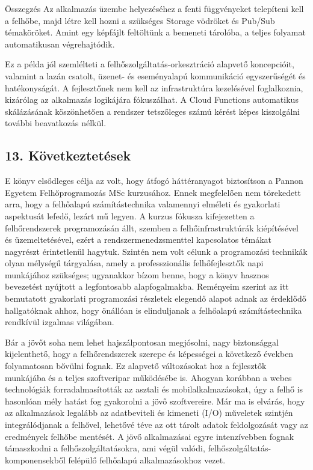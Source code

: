 \documentclass[
]{article}
\begin{document}
Összegzés Az alkalmazás üzembe helyezéséhez a fenti függvényeket
telepíteni kell a felhőbe, majd létre kell hozni a szükséges Storage
vödröket és Pub/Sub témaköröket. Amint egy képfájlt feltöltünk a
bemeneti tárolóba, a teljes folyamat automatikusan végrehajtódik.

Ez a példa jól szemlélteti a felhőszolgáltatás-orkesztráció alapvető
koncepcióit, valamint a lazán csatolt, üzenet- és eseményalapú
kommunikáció egyszerűségét és hatékonyságát. A fejlesztőnek nem kell az
infrastruktúra kezelésével foglalkoznia, kizárólag az alkalmazás
logikájára fókuszálhat. A Cloud Functions automatikus skálázásának
köszönhetően a rendszer tetszőleges számú kérést képes kiszolgálni
további beavatkozás nélkül.

\hypertarget{kuxf6vetkeztetuxe9sek}{%
\subsection{13. Következtetések}\label{kuxf6vetkeztetuxe9sek}}

E könyv elsődleges célja az volt, hogy átfogó háttéranyagot biztosítson
a Pannon Egyetem Felhőprogramozás MSc kurzusához. Ennek megfelelően nem
törekedett arra, hogy a felhőalapú számítástechnika valamennyi elméleti
és gyakorlati aspektusát lefedő, lezárt mű legyen. A kurzus fókusza
kifejezetten a felhőrendszerek programozásán állt, szemben a
felhőinfrastruktúrák kiépítésével és üzemeltetésével, ezért a
rendszermenedzsmenttel kapcsolatos témákat nagyrészt érintetlenül
hagytuk. Szintén nem volt célunk a programozási technikák olyan mélységű
tárgyalása, amely a professzionális felhőfejlesztők napi munkájához
szükséges; ugyanakkor bízom benne, hogy a könyv hasznos bevezetést
nyújtott a legfontosabb alapfogalmakba. Reményeim szerint az itt
bemutatott gyakorlati programozási részletek elegendő alapot adnak az
érdeklődő hallgatóknak ahhoz, hogy önállóan is elinduljanak a felhőalapú
számítástechnika rendkívül izgalmas világában.

Bár a jövőt soha nem lehet hajszálpontosan megjósolni, nagy biztonsággal
kijelenthető, hogy a felhőrendszerek szerepe és képességei a következő
években folyamatosan bővülni fognak. Ez alapvető változásokat hoz a
fejlesztők munkájába és a teljes szoftveripar működésébe is. Ahogyan
korábban a webes technológiák forradalmasították az asztali és
mobilalkalmazásokat, úgy a felhő is hasonlóan mély hatást fog gyakorolni
a jövő szoftvereire. Már ma is elvárás, hogy az alkalmazások legalább az
adatbeviteli és kimeneti (I/O) műveletek szintjén integrálódjanak a
felhővel, lehetővé téve az ott tárolt adatok feldolgozását vagy az
eredmények felhőbe mentését. A jövő alkalmazásai egyre intenzívebben
fognak támaszkodni a felhőszolgáltatásokra, ami végül valódi,
felhőszolgáltatás-komponensekből felépülő felhőalapú alkalmazásokhoz
vezet.
\end{document}
